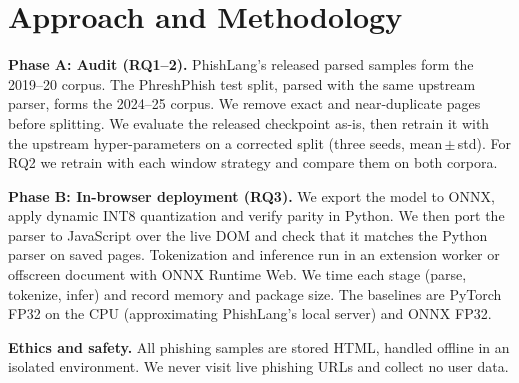 \documentclass[11pt]{article}
\begin{document}
\section{Approach and Methodology}
\textbf{Phase A: Audit (RQ1--2).} PhishLang's released parsed samples form the 2019--20 corpus. The PhreshPhish test split, parsed with the same upstream parser, forms the 2024--25 corpus. We remove exact and near-duplicate pages before splitting. We evaluate the released checkpoint as-is, then retrain it with the upstream hyper-parameters on a corrected split (three seeds, mean\,$\pm$\,std). For RQ2 we retrain with each window strategy and compare them on both corpora.

\textbf{Phase B: In-browser deployment (RQ3).} We export the model to ONNX, apply dynamic INT8 quantization and verify parity in Python. We then port the parser to JavaScript over the live DOM and check that it matches the Python parser on saved pages. Tokenization and inference run in an extension worker or offscreen document with ONNX Runtime Web. We time each stage (parse, tokenize, infer) and record memory and package size. The baselines are PyTorch FP32 on the CPU (approximating PhishLang's local server) and ONNX FP32.

\textbf{Ethics and safety.} All phishing samples are stored HTML, handled offline in an isolated environment. We never visit live phishing URLs and collect no user data.
\end{document}
